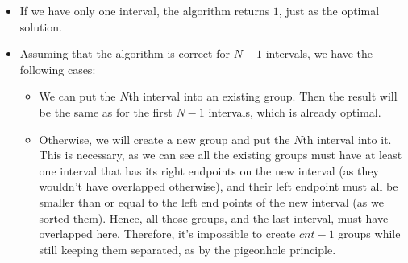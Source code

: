 \documentclass{article}
\begin{document}
\begin{itemize}
    \item If we have only one interval, the algorithm returns $1$, just as the optimal solution.
    \item Assuming that the algorithm is correct for $N-1$ intervals, we have the following cases:
    \begin{itemize}
        \item We can put the $N$th interval into an existing group. Then the result will be the same as for the first $N-1$ intervals, which is already optimal.
        \item Otherwise, we will create a new group and put the $N$th interval into it. This is necessary, as we can see all the existing groups must have at least one interval that has its right endpoints on the new interval (as they wouldn't have overlapped otherwise), and their left endpoint must all be smaller than or equal to the left end points of the new interval (as we sorted them). Hence, all those groups, and the last interval, must have overlapped here. Therefore, it's impossible to create $cnt - 1$ groups while still keeping them separated, as by the pigeonhole principle.
    \end{itemize}
\end{itemize}
\end{document}

